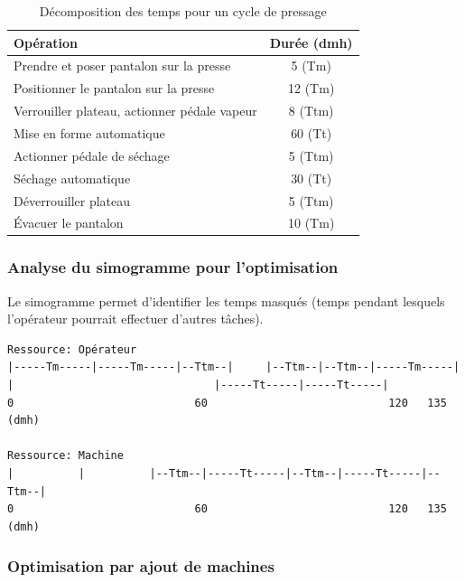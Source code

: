 \documentclass[a4paper,12pt]{article}
\begin{document}
\begin{table}[ht]
\centering
\begin{tabular}{|l|c|}
\hline
\textbf{Opération} & \textbf{Durée (dmh)} \\
\hline
Prendre et poser pantalon sur la presse & 5 (Tm) \\
Positionner le pantalon sur la presse & 12 (Tm) \\
Verrouiller plateau, actionner pédale vapeur & 8 (Ttm) \\
Mise en forme automatique & 60 (Tt) \\
Actionner pédale de séchage & 5 (Ttm) \\
Séchage automatique & 30 (Tt) \\
Déverrouiller plateau & 5 (Ttm) \\
Évacuer le pantalon & 10 (Tm) \\
\hline
\end{tabular}
\caption{Décomposition des temps pour un cycle de pressage}
\end{table}

\subsubsection{Analyse du simogramme pour l'optimisation}

Le simogramme permet d'identifier les temps masqués (temps pendant lesquels l'opérateur pourrait effectuer d'autres tâches).

\begin{center}
\begin{minipage}{0.9\textwidth}
\begin{verbatim}
Ressource: Opérateur
|-----Tm-----|-----Tm-----|--Ttm--|     |--Ttm--|--Ttm--|-----Tm-----|
|                               |-----Tt-----|-----Tt-----|
0                            60                            120   135 (dmh)

Ressource: Machine
|          |          |--Ttm--|-----Tt-----|--Ttm--|-----Tt-----|--Ttm--|
0                            60                            120   135 (dmh)
\end{verbatim}
\caption{Représentation simplifiée d'un simogramme}
\end{minipage}
\end{center}

\subsubsection{Optimisation par ajout de machines}
\end{document}
